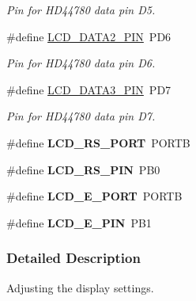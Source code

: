 \begin{DoxyCompactItemize}
\begin{DoxyCompactList}\small\item\em Pin for H\+D44780 data pin D5. \end{DoxyCompactList}\item 
\#define \hyperlink{a00011_ga7f3d53627337f6535cc8daa35876510a}{L\+C\+D\+\_\+\+D\+A\+T\+A2\+\_\+\+P\+IN}~P\+D6\hypertarget{a00011_ga7f3d53627337f6535cc8daa35876510a}{}\label{a00011_ga7f3d53627337f6535cc8daa35876510a}

\begin{DoxyCompactList}\small\item\em Pin for H\+D44780 data pin D6. \end{DoxyCompactList}\item 
\#define \hyperlink{a00011_ga54032ce0050853e181f879b69fec4370}{L\+C\+D\+\_\+\+D\+A\+T\+A3\+\_\+\+P\+IN}~P\+D7\hypertarget{a00011_ga54032ce0050853e181f879b69fec4370}{}\label{a00011_ga54032ce0050853e181f879b69fec4370}

\begin{DoxyCompactList}\small\item\em Pin for H\+D44780 data pin D7. \end{DoxyCompactList}\item 
\#define {\bfseries L\+C\+D\+\_\+\+R\+S\+\_\+\+P\+O\+RT}~P\+O\+R\+TB\hypertarget{a00011_gac5be2a22727fd9ca349e1c9bcbfbcd47}{}\label{a00011_gac5be2a22727fd9ca349e1c9bcbfbcd47}

\item 
\#define {\bfseries L\+C\+D\+\_\+\+R\+S\+\_\+\+P\+IN}~P\+B0\hypertarget{a00011_gae5c0a0a5750f3aaea06083e3a4a31f5d}{}\label{a00011_gae5c0a0a5750f3aaea06083e3a4a31f5d}

\item 
\#define {\bfseries L\+C\+D\+\_\+\+E\+\_\+\+P\+O\+RT}~P\+O\+R\+TB\hypertarget{a00011_gaf97f97ff3832d1289bbcb471090ea297}{}\label{a00011_gaf97f97ff3832d1289bbcb471090ea297}

\item 
\#define {\bfseries L\+C\+D\+\_\+\+E\+\_\+\+P\+IN}~P\+B1\hypertarget{a00011_gae644d776392a8d47899d9910c2b8feb6}{}\label{a00011_gae644d776392a8d47899d9910c2b8feb6}

\end{DoxyCompactItemize}


\subsubsection{Detailed Description}
Adjusting the display settings. 


